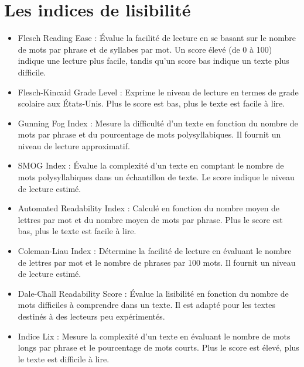 \documentclass[12pt,a4paper,oneside,titlepage]{book} %
\begin{document}
	\section*{Les indices de lisibilité}
\begin{itemize}
		
	\item Flesch Reading Ease : Évalue la facilité de lecture en se basant sur le nombre de mots par phrase et de syllabes par mot. Un score élevé (de 0 à 100) indique une lecture plus facile, tandis qu'un score bas indique un texte plus difficile.
	
	\item Flesch-Kincaid Grade Level : Exprime le niveau de lecture en termes de grade scolaire aux États-Unis. Plus le score est bas, plus le texte est facile à lire.
	
	\item Gunning Fog Index : Mesure la difficulté d'un texte en fonction du nombre de mots par phrase et du pourcentage de mots polysyllabiques. Il fournit un niveau de lecture approximatif.
	
	\item SMOG Index : Évalue la complexité d'un texte en comptant le nombre de mots polysyllabiques dans un échantillon de texte. Le score indique le niveau de lecture estimé.
	
	\item Automated Readability Index : Calculé en fonction du nombre moyen de lettres par mot et du nombre moyen de mots par phrase. Plus le score est bas, plus le texte est facile à lire.
	
	\item Coleman-Liau Index : Détermine la facilité de lecture en évaluant le nombre de lettres par mot et le nombre de phrases par 100 mots. Il fournit un niveau de lecture estimé.
	
	\item Dale-Chall Readability Score : Évalue la lisibilité en fonction du nombre de mots difficiles à comprendre dans un texte. Il est adapté pour les textes destinés à des lecteurs peu expérimentés.
	
	\item Indice Lix : Mesure la complexité d'un texte en évaluant le nombre de mots longs par phrase et le pourcentage de mots courts. Plus le score est élevé, plus le texte est difficile à lire.


\end{itemize}	
\end{document}
